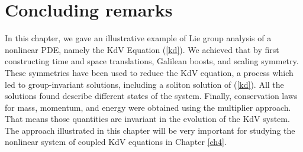 \section{Concluding remarks}
In this chapter, we gave an illustrative example of Lie group analysis of a nonlinear PDE, namely the KdV Equation (\ref{kd}). We achieved that by first constructing time and space translations, Galilean boosts, and scaling symmetry. These symmetries have been used to reduce the KdV equation, a process which led to group-invariant solutions, including a soliton solution of (\ref{kd}). All the solutions found describe different states of the system. Finally, conservation laws for mass, momentum, and energy were obtained using the multiplier approach.    That means those quantities are invariant in the evolution of the KdV system. The approach illustrated in this chapter will be very important for studying the nonlinear system of coupled KdV equations in Chapter \ref{ch4}.